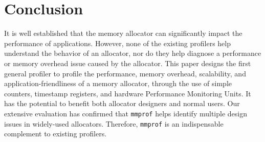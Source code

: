 \section{Conclusion}
\label{sec:conclusion}

It is well established that the memory allocator can significantly impact the performance of applications. However, none of the existing profilers help understand the behavior of an allocator, nor do they help diagnose a performance or memory overhead issue caused by the allocator. This paper designs the first general profiler to profile the performance, memory overhead, scalability, and application-friendliness of a memory allocator, through the use of simple counters, timestamp registers, and hardware Performance Monitoring Units. It has the potential to benefit both allocator designers and normal users. Our extensive evaluation has confirmed that \texttt{mmprof} helps identify multiple design issues in widely-used allocators. Therefore, \texttt{mmprof} is an indispensable complement to existing profilers. 
